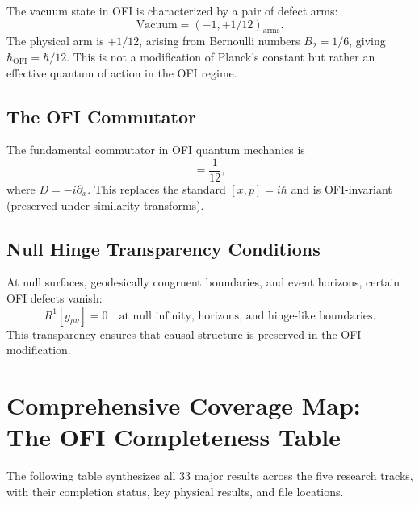 \documentclass[12pt,a4paper]{article}
\theoremstyle{definition}
\newcommand{\Ialpha}{I^{\alpha}}
\newcommand{\defect}[1]{R^{#1}}
\newcommand{\OFI}{\text{OFI}}
\newcommand{\hbarOFI}{\hbar_{\OFI}}
\begin{document}
The vacuum state in OFI is characterized by a pair of defect arms:
\begin{equation}
\text{Vacuum} = (-1, +1/12)_{\text{arms}}.
\end{equation}
The physical arm is $+1/12$, arising from Bernoulli numbers $B_2 = 1/6$, giving $\hbarOFI = \hbar/12$. This is not a modification of Planck's constant but rather an effective quantum of action in the OFI regime.

\subsection{The OFI Commutator}

The fundamental commutator in OFI quantum mechanics is
\begin{equation}
[\Ialpha D, D\Ialpha] = \frac{1}{12},
\end{equation}
where $D = -i\partial_x$. This replaces the standard $[x, p] = i\hbar$ and is OFI-invariant (preserved under similarity transforms).

\subsection{Null Hinge Transparency Conditions}

At null surfaces, geodesically congruent boundaries, and event horizons, certain OFI defects vanish:
\begin{equation}
\defect{1}[g_{\mu\nu}] = 0 \quad \text{at null infinity, horizons, and hinge-like boundaries}.
\end{equation}
This transparency ensures that causal structure is preserved in the OFI modification.

\newpage

\section{Comprehensive Coverage Map: The OFI Completeness Table}

The following table synthesizes all 33 major results across the five research tracks, with their completion status, key physical results, and file locations.
\end{document}
